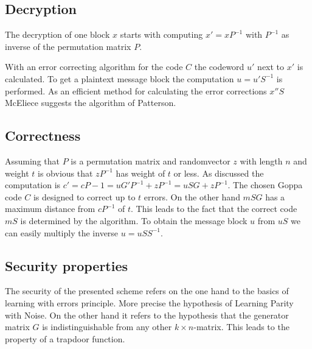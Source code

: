 \subsection*{Decryption}
The decryption of one block $x$ starts with computing $x' = xP^{-1}$ with $P^{-1}$ as inverse of the permutation matrix $P$. 

With an error correcting algorithm for the code $C$ the codeword $u'$ next to $x'$ is calculated. 
To get a plaintext message block the computation $u = u'S^{-1}$ is performed\cite{wiki:mcelice}\cite{mceliece1978public}.
As an efficient method for calculating the error corrections $x''S$ McEliece suggests the algorithm of Patterson\cite{patterson1975algebraic}. 


\subsection*{Correctness}
Assuming that $P$ is a permutation matrix and randomvector $z$ with length $n$ and weight $t$ is obvious that $zP^{-1}$ has weight of $t$ or less.
As discussed the computation is $c' = c P - 1 = uG'P^{-1} + zP^{-1} = uSG + z P^{-1}$.
The chosen Goppa code $C$ is designed to correct up to $t$ errors. On the other hand $mSG$ has a maximum distance from $cP^{-1}$ of $t$. This leads to the fact that the correct code $mS$ is determined by the algorithm. 
To obtain the message block $u$ from $uS$ we can easily multiply the inverse $u = uSS^{-1}$\cite{wiki:mcelice}.

\subsection*{Security properties}
The security of the presented scheme refers on the one hand to the basics of learning with errors principle. More precise the hypothesis of Learning Parity with Noise\cite{pietrzak2012cryptography}. 
On the other hand it refers to the hypothesis that the generator matrix $G$ is indistinguishable from any other $k \times n$-matrix. This leads to the property of a trapdoor function.

